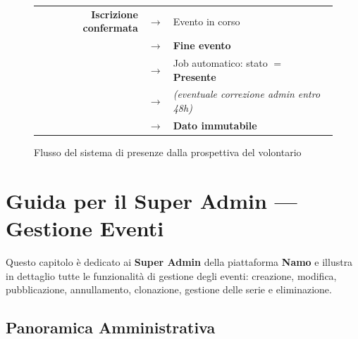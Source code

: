 \documentclass[a4paper,11pt,oneside]{book}
\newcommand{\namo}{\textbf{Namo}}
\begin{document}
\begin{figure}[htbp]
\centering
\begin{tcolorbox}[
  enhanced,
  colback=namoGray,
  colframe=namoCharcoal,
  width=0.9\textwidth,
  arc=6pt,
  boxrule=0.8pt,
  left=10pt, right=10pt, top=10pt, bottom=10pt,
]
\centering
\small
\begin{tabular}{rcl}
\textbf{Iscrizione confermata} & $\longrightarrow$ & Evento in corso \\[6pt]
 & $\longrightarrow$ & \textbf{Fine evento} \\[6pt]
 & $\longrightarrow$ & Job automatico: stato $=$ \textcolor{namoGreen}{\textbf{Presente}} \\[6pt]
 & $\longrightarrow$ & \textit{(eventuale correzione admin entro 48h)} \\[6pt]
 & $\longrightarrow$ & \textbf{Dato immutabile}
\end{tabular}
\end{tcolorbox}
\caption{Flusso del sistema di presenze dalla prospettiva del volontario}
\label{fig:flusso-presenze}
\end{figure}


\chapter{Guida per il Super Admin --- Gestione Eventi}
\label{ch:admin-eventi}

Questo capitolo \`e dedicato ai \textbf{Super Admin} della piattaforma \namo{} e illustra in dettaglio tutte le funzionalit\`a di gestione degli eventi: creazione, modifica, pubblicazione, annullamento, clonazione, gestione delle serie e eliminazione.

\section{Panoramica Amministrativa}
\label{sec:admin-panoramica}
\end{document}

